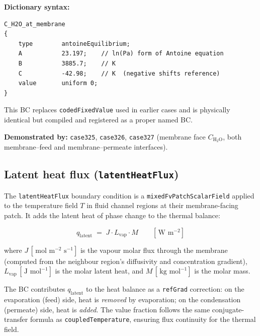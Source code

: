 \documentclass[11pt,a4paper]{article}
\newcommand{\mol}{\,\text{mol}}
\newcommand{\m}{\,\text{m}}
\newcommand{\s}{\,\text{s}}
\newcommand{\J}{\,\text{J}}
\newcommand{\W}{\,\text{W}}
\newcommand{\kg}{\,\text{kg}}
\newcommand{\caseref}[1]{\texttt{\color{casegreen}#1}}
\newcommand{\bctype}[1]{\texttt{\color{foamblue}#1}}
\begin{document}
\textbf{Dictionary syntax:}
\begin{verbatim}
C_H2O_at_membrane
{
    type        antoineEquilibrium;
    A           23.197;    // ln(Pa) form of Antoine equation
    B           3885.7;    // K
    C           -42.98;    // K  (negative shifts reference)
    value       uniform 0;
}
\end{verbatim}

This BC replaces \texttt{codedFixedValue} used in earlier cases and is
physically identical but compiled and registered as a proper named BC.

\begin{tcolorbox}[casebox]
  \textbf{Demonstrated by:} \caseref{case325}, \caseref{case326},
  \caseref{case327} (membrane face $C_\text{H$_2$O}$, both membrane–feed and
  membrane–permeate interfaces).
\end{tcolorbox}

\subsection{Latent heat flux (\texttt{latentHeatFlux})}
\label{sec:latent}

The \bctype{latentHeatFlux} boundary condition is a
\texttt{mixedFvPatchScalarField} applied to the temperature field $T$ in
fluid channel regions at their membrane-facing patch.  It adds the latent heat
of phase change to the thermal balance:

\begin{tcolorbox}[eqbox,title={Latent heat coupling}]
\begin{equation}\label{eq:latent}
  q_\text{latent}
  \;=\;
  J \cdot L_\text{vap} \cdot M
  \qquad [\W\,\m^{-2}]
\end{equation}
\end{tcolorbox}

where $J\,[\mol\,\m^{-2}\,\s^{-1}]$ is the vapour molar flux through the
membrane (computed from the neighbour region's diffusivity and concentration
gradient), $L_\text{vap}\,[\J\,\mol^{-1}]$ is the molar latent heat, and
$M\,[\kg\,\mol^{-1}]$ is the molar mass.

The BC contributes $q_\text{latent}$ to the heat balance as a
\texttt{refGrad} correction: on the evaporation (feed) side, heat is
\emph{removed} by evaporation; on the condensation (permeate) side, heat is
\emph{added}.  The value fraction follows the same conjugate-transfer formula
as \bctype{coupledTemperature}, ensuring flux continuity for the thermal field.
\end{document}
